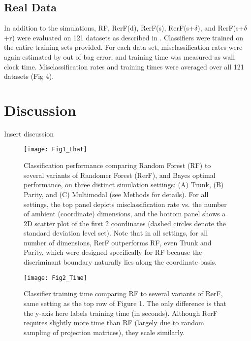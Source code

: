 \documentclass{article} %
\begin{document}
\subsection{Real Data}

In addition to the simulations, RF, RerF(d), RerF(s), RerF(s+$\delta$), and RerF(s+$\delta$+r) were evaluated on 121 datasets as described in \cite{}. Classifiers were trained on the entire training sets provided. For each data set, misclassification rates were again estimated by out of bag error, and training time was measured as wall clock time. Misclassification rates and training times were averaged over all 121 datasets (Fig 4).

\section{Discussion}

Insert discussion

\begin{figure}[h]
\begin{center}
\texttt{[image: Fig1\_Lhat]}
\end{center}
\caption{Classification performance comparing Random Forest (RF) to several variants of Randomer Forest (RerF), and Bayes optimal performance, on three distinct simulation settings: (A) Trunk, (B) Parity, and (C) Multimodal (see Methods for details).  For all settings, the top panel depicts misclassification rate vs. the number of ambient (coordinate) dimensions, and the bottom panel shows a 2D scatter plot of the first 2 coordinates (dashed circles denote the standard deviation level set).  Note that in all settings, for all number of dimensions, RerF outperforms RF, even Trunk and Parity, which were designed specifically for RF because the discriminant boundary naturally lies along the coordinate basis.}
\end{figure}

\begin{figure}[h]
\begin{center}
\texttt{[image: Fig2\_Time]}
\end{center}
\caption{Classifier training time comparing RF to several variants of RerF, same setting as the top row of Figure 1. The only difference is that the y-axis here labels training time (in seconds). Although RerF requires slightly more time than RF (largely due to random sampling of projection matrices), they scale similarly.}
\end{figure}
\end{document}
